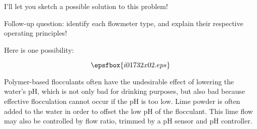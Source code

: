 





I'll let you sketch a possible solution to this problem!

\vskip 10pt

Follow-up question: identify each flowmeter type, and explain their respective operating principles!







Here is one possibility:

$$\epsfbox{i01732x02.eps}$$

Polymer-based flocculants often have the undesirable effect of lowering the water's pH, which is not only bad for drinking purposes, but also bad because effective flocculation cannot occur if the pH is too low.  Lime powder is often added to the water in order to offset the low pH of the flocculant.  This lime flow may also be controlled by flow ratio, trimmed by a pH sensor and pH controller.




